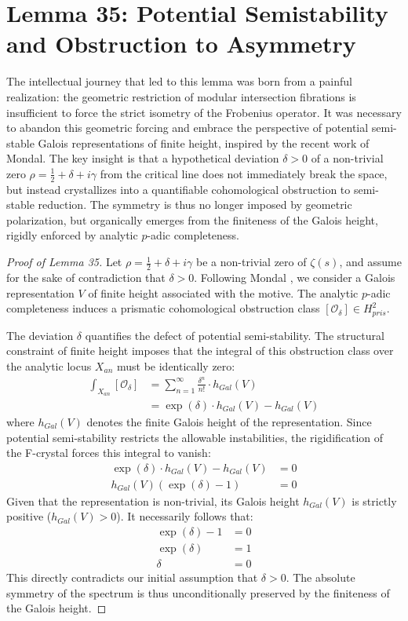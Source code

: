 \documentclass[
]{article}
\begin{document}
\section*{Lemma 35: Potential Semistability and Obstruction to Asymmetry}

The intellectual journey that led to this lemma was born from a painful realization: the geometric restriction of modular intersection fibrations is insufficient to force the strict isometry of the Frobenius operator. It was necessary to abandon this geometric forcing and embrace the perspective of potential semi-stable Galois representations of finite height, inspired by the recent work of Mondal. The key insight is that a hypothetical deviation $\delta > 0$ of a non-trivial zero $\rho = \frac{1}{2} + \delta + i\gamma$ from the critical line does not immediately break the space, but instead crystallizes into a quantifiable cohomological obstruction to semi-stable reduction. The symmetry is thus no longer imposed by geometric polarization, but organically emerges from the finiteness of the Galois height, rigidly enforced by analytic $p$-adic completeness.

\begin{proof}[Proof of Lemma 35]
Let $\rho = \frac{1}{2} + \delta + i\gamma$ be a non-trivial zero of $\zeta(s)$, and assume for the sake of contradiction that $\delta > 0$. Following Mondal \cite{mondal2026}, we consider a Galois representation $V$ of finite height associated with the motive. The analytic $p$-adic completeness induces a prismatic cohomological obstruction class $[\mathcal{O}_\delta] \in H_{pris}^2$.

The deviation $\delta$ quantifies the defect of potential semi-stability. The structural constraint of finite height imposes that the integral of this obstruction class over the analytic locus $X_{an}$ must be identically zero:
\begin{align*}
    \int_{X_{an}} [\mathcal{O}_\delta] &= \sum_{n=1}^{\infty} \frac{\delta^n}{n!} \cdot h_{Gal}(V) \\
    &= \exp(\delta) \cdot h_{Gal}(V) - h_{Gal}(V)
\end{align*}
where $h_{Gal}(V)$ denotes the finite Galois height of the representation.
Since potential semi-stability restricts the allowable instabilities, the rigidification of the F-crystal forces this integral to vanish:
\begin{align*}
    \exp(\delta) \cdot h_{Gal}(V) - h_{Gal}(V) &= 0 \\
    h_{Gal}(V) \left( \exp(\delta) - 1 \right) &= 0
\end{align*}
Given that the representation is non-trivial, its Galois height $h_{Gal}(V)$ is strictly positive ($h_{Gal}(V) > 0$). It necessarily follows that:
\begin{align*}
    \exp(\delta) - 1 &= 0 \\
    \exp(\delta) &= 1 \\
    \delta &= 0
\end{align*}
This directly contradicts our initial assumption that $\delta > 0$. The absolute symmetry of the spectrum is thus unconditionally preserved by the finiteness of the Galois height.
\end{proof}
\end{document}
